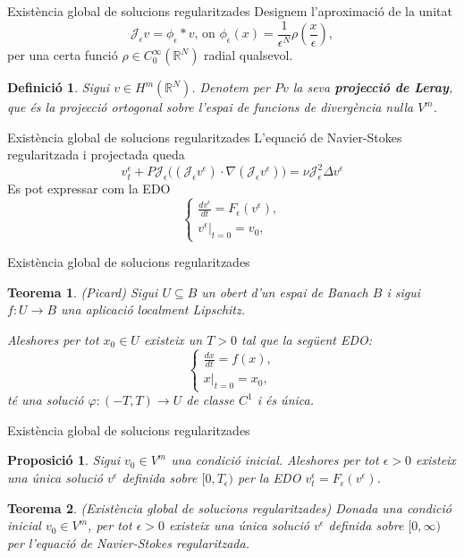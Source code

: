 \documentclass{beamer}
\newtheorem{teorema}{Teorema}
\newtheorem{definicio}{Definici\'{o}}
\newtheorem{proposicio}{Proposici\'{o}}
\begin{document}
\begin{frame}{Exist\`{e}ncia global de solucions regularitzades}
Designem l'aproximaci\'{o} de la unitat
\[\mathcal{J}_{\epsilon}v=\phi_{\epsilon}*v\text{, on }\phi_{\epsilon}(x)=\frac{1}{\epsilon^N}\rho\left(\frac{x}{\epsilon}\right),\]
per una certa funci\'{o} $\rho\in C_0^{\infty}(\mathbb{R}^N)$ radial qualsevol.
\pause

\begin{definicio}
Sigui $v\in H^m(\mathbb{R}^N)$. Denotem per $Pv$ la seva \textbf{projecci\'{o} de Leray}, que \'{e}s la projecci\'{o} ortogonal sobre l'espai de funcions de diverg\`{e}ncia nul\textperiodcentered la $V^m$.
\end{definicio}
\end{frame}

\begin{frame}{Exist\`{e}ncia global de solucions regularitzades}
L'equaci\'{o} de Navier-Stokes regularitzada i projectada queda
\[v_t^{\epsilon}+P\mathcal{J}_{\epsilon}\big((\mathcal{J}_{\epsilon}v^{\epsilon})\cdot\nabla(\mathcal{J}_{\epsilon}v^{\epsilon})\big)=\nu\mathcal{J}_{\epsilon}^2\Delta v^{\epsilon}\]
Es pot expressar com la EDO
\[\left\{\begin{array}{l}\displaystyle{\frac{dv^{\epsilon}}{dt}=F_{\epsilon}(v^{\epsilon})},\\v^{\epsilon}|_{t=0}=v_0,\end{array}\right.\]
\end{frame}

\begin{frame}{Exist\`{e}ncia global de solucions regularitzades}
\begin{teorema}
(Picard) Sigui $U\subseteq B$ un obert d'un espai de Banach $B$ i sigui $f:U\rightarrow B$ una aplicaci\'{o} localment Lipschitz.

Aleshores per tot $x_0\in U$ existeix un $T>0$ tal que la seg\"{u}ent EDO:
\[\left\{\begin{array}{l}\displaystyle{\frac{dx}{dt}=f(x),}\\x|_{t=0}=x_0,\end{array}\right.\]
t\'{e} una soluci\'{o} $\varphi:(-T,T)\rightarrow U$ de classe $C^1$ i \'{e}s \'{u}nica.
\end{teorema}
\end{frame}

\begin{frame}{Exist\`{e}ncia global de solucions regularitzades}
\begin{proposicio}
Sigui $v_0\in V^m$ una condici\'{o} inicial. Aleshores per tot $\epsilon>0$ existeix una \'{u}nica soluci\'{o} $v^{\epsilon}$ definida sobre $[0,T_{\epsilon})$ per la EDO $v_t^{\epsilon}=F_{\epsilon}(v^{\epsilon})$.
\end{proposicio}
\pause
\begin{teorema}
(Exist\`{e}ncia global de solucions regularitzades) Donada una condici\'{o} inicial $v_0\in V^m$, per tot $\epsilon>0$ existeix una \'{u}nica soluci\'{o} $v^{\epsilon}$ definida sobre $[0,\infty)$ per l'equaci\'{o} de Navier-Stokes regularitzada.
\end{teorema}
\end{frame}
\end{document}
